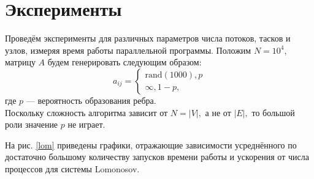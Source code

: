 \documentclass[a4paper,12pt]{report}
\begin{document}
\section*{Эксперименты}
	\par Проведём эксперименты для различных параметров числа потоков, тасков и узлов, измеряя время работы параллельной программы. Положим $N = 10^4$, матрицу $A$ будем генерировать следующим образом:
$$
a_{ij} = \begin{cases}
		\text{rand}(1000), p\\
		\infty, 1 - p,
		\end{cases}
$$
где $p$ --- вероятность образования ребра.\\
Поскольку сложность алгоритма зависит от $N = |V|,$ а не от $|E|,$ то большой роли значение $p$ не играет.
	\par На рис. \ref{lom} приведены графики, отражающие зависимости усреднённого по достаточно большому количеству запусков времени работы и ускорения от числа процессов для системы Lomonosov.
	
\end{document}
